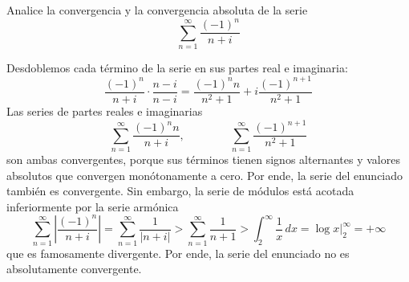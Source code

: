 \begin{exercise}
Analice la convergencia y la convergencia absoluta de la serie
$$\sum_{n=1}^\infty \frac {(-1)^n} {n+i}$$
\end{exercise}

\begin{solution}
Desdoblemos cada término de la serie en sus partes real e imaginaria:
$$
\frac {(-1)^n} {n+i} \cdot \frac {n-i} {n-i} =
\frac {(-1)^n n} {n^2 + 1} + i \frac {(-1)^{n+1}} {n^2 + 1}
$$
Las series de partes reales e imaginarias
$$
\sum_{n=1}^\infty \frac {(-1)^n n} {n+i}, \qquad \qquad
\sum_{n=1}^\infty \frac {(-1)^{n+1}} {n^2 + 1}
$$
son ambas convergentes, porque sus términos tienen signos alternantes y valores absolutos que convergen monótonamente a cero. Por ende, la serie del enunciado también es convergente. Sin embargo, la serie de módulos está acotada inferiormente por la serie armónica
$$
\sum_{n=1}^\infty \left| \frac {(-1)^n} {n+i} \right|
    = \sum_{n=1}^\infty \frac 1 {|n+i|}
    > \sum_{n=1}^\infty \frac 1 {n+1}
    > \int_2^\infty \frac 1x \, dx
    = \log x \Big \vert_2^\infty
= +\infty
$$
que es famosamente divergente. Por ende, la serie del enunciado no es absolutamente convergente.
\end{solution}
